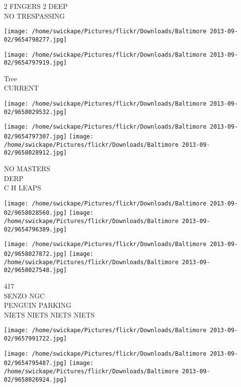 \documentclass[10pt,letterpaper]{article}
\begin{document}
2 FINGERS 2 DEEP\\
NO TRESPASSING\\
\pagebreak

\texttt{[image: /home/swickape/Pictures/flickr/Downloads/Baltimore 2013-09-02/9654798277.jpg]}

\vspace{0.25in}
\texttt{[image: /home/swickape/Pictures/flickr/Downloads/Baltimore 2013-09-02/9654797919.jpg]}

Tree\\
CURRENT\\
\pagebreak

\texttt{[image: /home/swickape/Pictures/flickr/Downloads/Baltimore 2013-09-02/9658029532.jpg]}

\vspace{0.25in}
\texttt{[image: /home/swickape/Pictures/flickr/Downloads/Baltimore 2013-09-02/9654797307.jpg]}
\texttt{[image: /home/swickape/Pictures/flickr/Downloads/Baltimore 2013-09-02/9658028912.jpg]}

NO MASTERS\\
DERP\\
C H LEAPS\\
\pagebreak

\texttt{[image: /home/swickape/Pictures/flickr/Downloads/Baltimore 2013-09-02/9658028560.jpg]}
\texttt{[image: /home/swickape/Pictures/flickr/Downloads/Baltimore 2013-09-02/9654796389.jpg]}

\texttt{[image: /home/swickape/Pictures/flickr/Downloads/Baltimore 2013-09-02/9658027872.jpg]}
\texttt{[image: /home/swickape/Pictures/flickr/Downloads/Baltimore 2013-09-02/9658027548.jpg]}

417\\
SENZO NGC\\
PENGUIN PARKING\\
NIETS NIETS NIETS NIETS\\
\pagebreak

\texttt{[image: /home/swickape/Pictures/flickr/Downloads/Baltimore 2013-09-02/9657991722.jpg]}

\vspace{0.25in}
\texttt{[image: /home/swickape/Pictures/flickr/Downloads/Baltimore 2013-09-02/9654795487.jpg]}
\texttt{[image: /home/swickape/Pictures/flickr/Downloads/Baltimore 2013-09-02/9658026924.jpg]}
\end{document}
